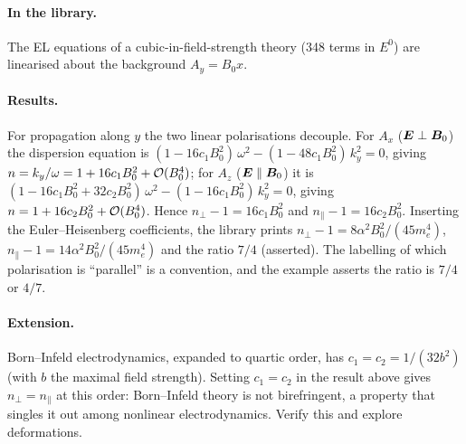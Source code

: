 \paragraph{In the library.} The EL equations of a cubic-in-field-strength theory (348 terms in $E^0$) are linearised about the background $A_y=B_0x$.


\paragraph{Results.} For propagation along $y$ the two linear polarisations decouple. For $A_x$ ($\bm{E}\perp\bm{B}_0$) the dispersion equation is $(1-16c_1B_0^2)\,\omega^2-(1-48c_1B_0^2)\,k_y^2=0$, giving $n=k_y/\omega=1+16c_1B_0^2+\mathcal{O}(B_0^4)$; for $A_z$ ($\bm{E}\parallel\bm{B}_0$) it is $(1-16c_1B_0^2+32c_2B_0^2)\,\omega^2-(1-16c_1B_0^2)\,k_y^2=0$, giving $n=1+16c_2B_0^2+\mathcal{O}(B_0^4)$. Hence $n_\perp-1=16c_1B_0^2$ and $n_\parallel-1=16c_2B_0^2$. Inserting the Euler--Heisenberg coefficients, the library prints $n_\perp-1=8\alpha^2B_0^2/(45m_e^4)$, $n_\parallel-1=14\alpha^2B_0^2/(45m_e^4)$ and the ratio $7/4$ (asserted). The labelling of which polarisation is ``parallel'' is a convention, and the example asserts the ratio is $7/4$ or $4/7$.

\paragraph{Extension.} Born--Infeld electrodynamics, expanded to quartic order, has $c_1=c_2=1/(32b^2)$ (with $b$ the maximal field strength). Setting $c_1=c_2$ in the result above gives $n_\perp=n_\parallel$ at this order: Born--Infeld theory is not birefringent, a property that singles it out among nonlinear electrodynamics. Verify this and explore deformations.


